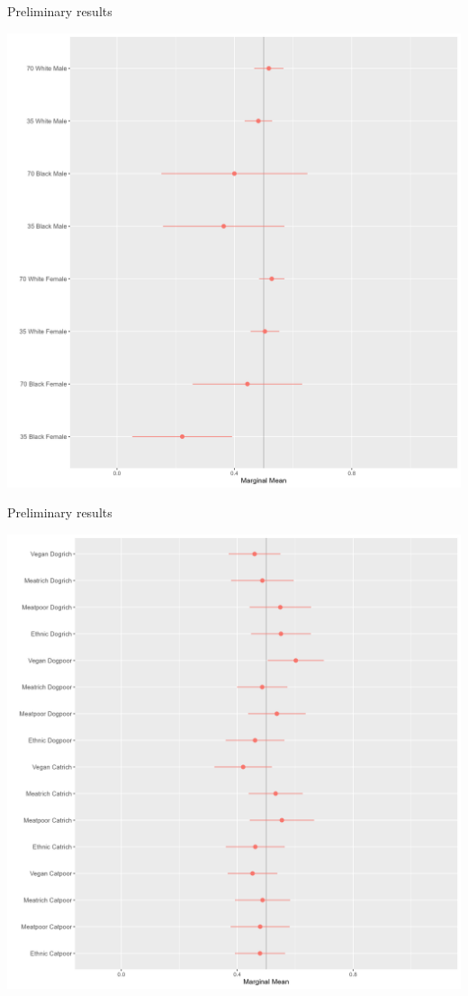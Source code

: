 \documentclass[
  ignorenonframetext,
]{beamer}
\begin{document}
\begin{frame}{Preliminary results}
\label{preliminary-results-1}
\begin{center}\includegraphics[width=0.75\linewidth]{Presentation/images/interaction1} \end{center}
\end{frame}

\begin{frame}{Preliminary results}
\label{preliminary-results-2}
\begin{center}\includegraphics[width=0.75\linewidth]{Presentation/images/interaction2} \end{center}
\end{frame}
\end{document}
